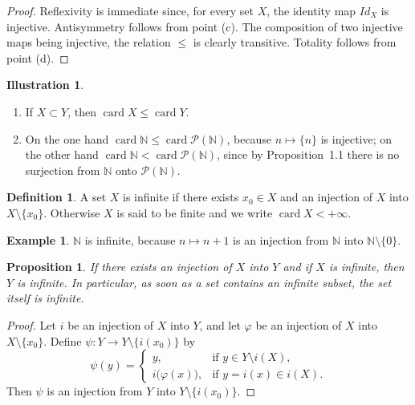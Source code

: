 \documentclass[12pt]{article}
\newtheorem{proposition}{Proposition}[section]
\theoremstyle{definition}
\newtheorem{definition}{Definition}[section]
\newtheorem{example}{Example}[section]
\newtheorem{illustration}{Illustration}[section]
\begin{document}
\begin{proof}
Reflexivity is immediate since, for every set $X$, the identity map $Id_X$ is injective.
Antisymmetry follows from point (c).
The composition of two injective maps being injective, the relation $\le$ is clearly transitive.
Totality follows from point (d).
\end{proof}

\begin{illustration}
\begin{enumerate}[label=\arabic*.,leftmargin=2em]
\item If $X\subset Y$, then $\operatorname{card} X\le \operatorname{card} Y$.
\item On the one hand $\operatorname{card}\mathbb N\le \operatorname{card}\mathcal P(\mathbb N)$, because $n\mapsto\{n\}$ is injective;
on the other hand $\operatorname{card}\mathbb N < \operatorname{card}\mathcal P(\mathbb N)$, since by Proposition~1.1 there is no surjection from $\mathbb N$ onto $\mathcal P(\mathbb N)$.
\end{enumerate}
\end{illustration}

\begin{definition}
A set $X$ is infinite if there exists $x_0\in X$ and an injection of $X$ into $X\setminus\{x_0\}$.
Otherwise $X$ is said to be finite and we write $\operatorname{card} X < +\infty$.
\end{definition}

\begin{example}
$\mathbb N$ is infinite, because $n\mapsto n+1$ is an injection from $\mathbb N$ into $\mathbb N\setminus\{0\}$.
\end{example}

\begin{proposition}
If there exists an injection of $X$ into $Y$ and if $X$ is infinite, then $Y$ is infinite.
In particular, as soon as a set contains an infinite subset, the set itself is infinite.
\end{proposition}

\begin{proof}
Let $i$ be an injection of $X$ into $Y$, and let $\varphi$ be an injection of $X$ into $X\setminus\{x_0\}$.
Define $\psi:Y\to Y\setminus\{i(x_0)\}$ by
\[
\psi(y)=
\begin{cases}
y, & \text{if } y\in Y\setminus i(X),\\
i\bigl(\varphi(x)\bigr), & \text{if } y=i(x)\in i(X).
\end{cases}
\]
Then $\psi$ is an injection from $Y$ into $Y\setminus\{i(x_0)\}$.
\end{proof}
\end{document}

